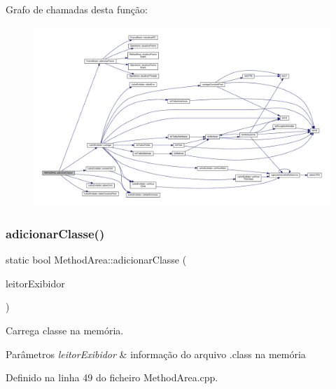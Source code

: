 Grafo de chamadas desta função\+:
\nopagebreak
\begin{figure}[H]
\begin{center}
\leavevmode
\includegraphics[width=350pt]{classMethodArea_a30233142aefa26c17a3a222582cb56c1_cgraph}
\end{center}
\end{figure}
\mbox{\label{classMethodArea_af8c5a64c3e17fb33809b1cea9b85a8b1}} 
\subsubsection{\texorpdfstring{adicionar\+Classe()}{adicionarClasse()}\hspace{0.1cm}{\footnotesize\ttfamily [2/2]}}
{\footnotesize\ttfamily static bool Method\+Area\+::adicionar\+Classe (\begin{DoxyParamCaption}\item[{\hyperlink{classLeitorExibidor}{Leitor\+Exibidor} $\ast$}]{leitor\+Exibidor }\end{DoxyParamCaption})\hspace{0.3cm}{\ttfamily [static]}}



Carrega classe na memória. 


\begin{DoxyParams}{Parâmetros}
{\em leitor\+Exibidor} & informação do arquivo .class na memória \\
\hline
\end{DoxyParams}


Definido na linha 49 do ficheiro Method\+Area.\+cpp.



